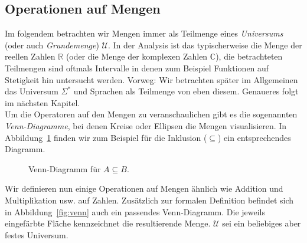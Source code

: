 \documentclass[11pt, a4paper]{article}
\theoremstyle{definition}
\theoremstyle{plain}
\numberwithin{equation}{section}
\begin{document}
\subsection{Operationen auf Mengen}\label{sec:pre_setops}
Im folgendem betrachten wir Mengen immer als Teilmenge eines \textit{Universums} (oder auch \textit{Grundemenge}) \( \mathcal{U} \). In der Analysis ist das typischerweise die Menge der reellen Zahlen \( \mathbb{R} \) (oder die Menge der komplexen Zahlen \( \mathbb{C} \)), die betrachteten Teilmengen sind oftmals Intervalle in denen zum Beispiel Funktionen auf Stetigkeit hin untersucht werden. Vorweg: Wir betrachten später im Allgemeinen das Universum \( \Sigma^\ast \) und Sprachen als Teilmenge von eben diesem. Genaueres folgt im nächsten Kapitel.\\
Um die Operatoren auf den Mengen zu veranschaulichen gibt es die sogenannten \textit{Venn-Diagramme}, bei denen Kreise oder Ellipsen die Mengen visualisieren. In Abbildung~\ref{fig:venn_subset} finden wir zum Beispiel für die Inklusion (\( \subseteq \)) ein entsprechendes Diagramm.
\begin{figure}
	\centering
	
	\caption{Venn-Diagramm für \( A \subseteq B \).}
	\label{fig:venn_subset}
\end{figure}
Wir definieren nun einige Operationen auf Mengen ähnlich wie Addition und Multiplikation usw. auf Zahlen. Zusätzlich zur formalen Definition befindet sich in Abbildung~\ref{fig:venn} auch ein passendes Venn-Diagramm. Die jeweils eingefärbte Fläche kennzeichnet die resultierende Menge. \( \mathcal{U} \) sei ein beliebiges aber festes Universum.
\end{document}
